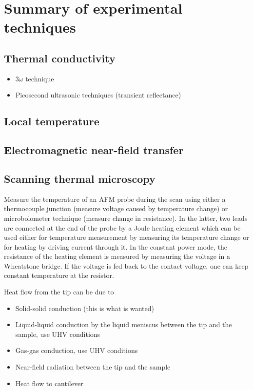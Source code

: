 \iffalse
\section{Summary of experimental techniques}

\subsection{Thermal conductivity}

\begin{itemize}
 \item $3\omega$ technique
 \item Picosecond ultrasonic techniques (transient reflectance)
\end{itemize}

\subsection{Local temperature}

\subsection{Electromagnetic near-field transfer}

\subsection{Scanning thermal microscopy}

Measure the temperature of an AFM probe during the scan using either a thermocouple junction (measure voltage caused by temperature change) or microbolometer technique (measure change in resistance). In the latter, two leads are connected at the end of the probe by a Joule heating element which can be used either for temperature measurement by measuring its temperature change or for heating by driving current through it. In the constant power mode, the resistance of the heating element is measured by measuring the voltage in a Wheatstone bridge. If the voltage is fed back to the contact voltage, one can keep constant temperature at the resistor. 

Heat flow from the tip can be due to
\begin{itemize}
 \item Solid-solid conduction (this is what is wanted)
 \item Liquid-liquid conduction by the liquid meniscus between the tip and the sample, use UHV conditions
 \item Gas-gas conduction, use UHV conditions
 \item Near-field radiation between the tip and the sample
 \item Heat flow to cantilever
\end{itemize}

